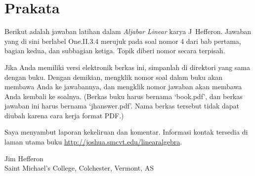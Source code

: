 \documentclass[twoside]{book}
\begin{document}

\frontmatter
\chapter*{Prakata}
Berikut adalah jawaban latihan dalam \textit{Aljabar Linear} karya
J~Hef{}feron.
Jawaban yang di sini berlabel
One.II.3.4 merujuk pada soal nomor 4
dari bab pertama,
bagian kedua, dan subbagian ketiga.
Topik diberi nomor secara terpisah.

Jika Anda memiliki versi elektronik berkas ini,
simpanlah di direktori yang sama dengan buku.
Dengan demikian,
mengklik nomor soal dalam buku akan membawa Anda ke jawabannya,
dan mengklik nomor jawaban akan membawa Anda kembali ke soalnya.
(Berkas buku harus bernama `book.pdf', dan berkas jawaban ini harus
bernama `jhanswer.pdf'.
Nama berkas tersebut tidak dapat diubah karena cara kerja format PDF.)

Saya menyambut laporan kekeliruan dan komentar.
Informasi kontak tersedia di laman utama buku
\url{http://joshua.smcvt.edu/linearalgebra}.

\vspace{.5in}
\begin{raggedright}
Jim Hef{}feron     \\
Saint Michael's College, Colchester, Vermont, AS \\

\end{raggedright}
\clearemptydoublepage\tableofcontents
\setcounter{page}{1}
\mainmatter
\thispagestyle{empty}

\end{document}

